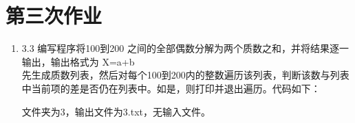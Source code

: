 \documentclass{ctexart}
\begin{document}
\section{第三次作业}

\begin{enumerate}
    \item{3.3}
    编写程序将100到200 之间的全部偶数分解为两个质数之和，并将结果逐一输出，输出格式为 X=a+b\\

    先生成质数列表，然后对每个100到200内的整数遍历该列表，判断该数与列表中当前项的差是否仍在列表中。如是，则打印并退出遍历。代码如下：

    文件夹为3，输出文件为3.txt，无输入文件。

\end{enumerate}
\end{document}
